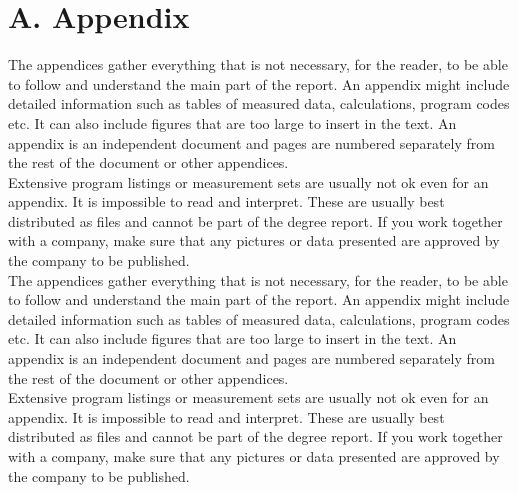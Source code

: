 
\clearpage

\setcounter{page}{1}
\renewcommand{\thepage}{A:\arabic{page}}


\pagestyle{fancy}

\fancyhead{} %

\fancyfoot{} %
\fancyfoot[C]{\thepage}

\section*{A. Appendix}
The appendices gather everything that is not necessary, for the reader, to be able to follow and understand the main part of the report. An appendix might include detailed information such as tables of measured data, calculations, program codes etc. It can also include figures that are too large to insert in the text. An appendix is an independent document and pages are numbered separately from the rest of the document or other appendices.\\
Extensive program listings or measurement sets are usually not ok even for an appendix. It is impossible to read and interpret.  These are usually best distributed as files and cannot be part of the degree report. If you work together with a company, make sure that any pictures or data presented are approved by the company to be published.\\
The appendices gather everything that is not necessary, for the reader, to be able to follow and understand the main part of the report. An appendix might include detailed information such as tables of measured data, calculations, program codes etc. It can also include figures that are too large to insert in the text. An appendix is an independent document and pages are numbered separately from the rest of the document or other appendices.\\
Extensive program listings or measurement sets are usually not ok even for an appendix. It is impossible to read and interpret.  These are usually best distributed as files and cannot be part of the degree report. If you work together with a company, make sure that any pictures or data presented are approved by the company to be published.\\
